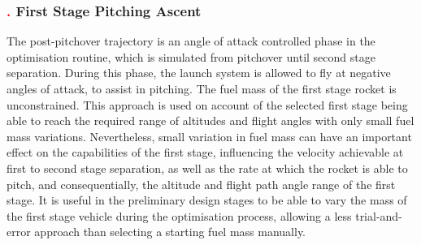 \subsubsection{\textcolor{red}{.} First Stage Pitching Ascent}


The post-pitchover trajectory is an angle of attack controlled phase in the optimisation routine, which is simulated from pitchover until second stage separation. During this phase, the launch system is allowed to fly at negative angles of attack, to assist in pitching. 
The fuel mass of the first stage rocket is unconstrained.
This approach is used on account of the selected first stage being able to reach the required range of altitudes and flight angles with only small fuel mass variations. 
Nevertheless, small variation in fuel mass can have an important effect on the capabilities of the first stage, influencing the velocity achievable at first to second stage separation, as well as the rate at which the rocket is able to pitch, and consequentially, the altitude and flight path angle range of the first stage.
It is useful in the preliminary design stages to be able to vary the mass of the first stage vehicle during the optimisation process, allowing a less trial-and-error approach than selecting a starting fuel mass manually.



